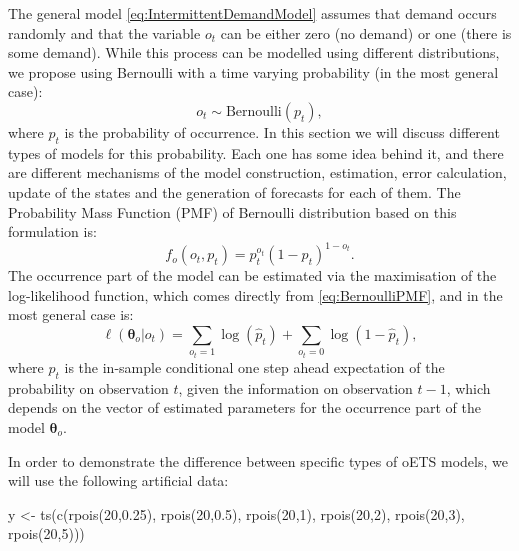 \documentclass[
]{book}
\newenvironment{Shaded}{\begin{snugshade}}{\end{snugshade}}
\newcommand{\DecValTok}[1]{\textcolor[rgb]{0.00,0.00,0.81}{#1}}
\newcommand{\FloatTok}[1]{\textcolor[rgb]{0.00,0.00,0.81}{#1}}
\newcommand{\FunctionTok}[1]{\textcolor[rgb]{0.00,0.00,0.00}{#1}}
\newcommand{\NormalTok}[1]{#1}
\newcommand{\OtherTok}[1]{\textcolor[rgb]{0.56,0.35,0.01}{#1}}
\theoremstyle{definition}
\theoremstyle{definition}
\theoremstyle{definition}
\theoremstyle{definition}
\theoremstyle{remark}
\begin{document}
The general model \eqref{eq:IntermittentDemandModel} assumes that demand occurs randomly and that the variable \(o_t\) can be either zero (no demand) or one (there is some demand). While this process can be modelled using different distributions, we propose using Bernoulli with a time varying probability (in the most general case):
\begin{equation}
    o_t \sim \text{Bernoulli} \left(p_t \right) ,
  \label{eq:OccurrenceModelBernoulli}
\end{equation}
where \(p_t\) is the probability of occurrence. In this section we will discuss different types of models for this probability. Each one has some idea behind it, and there are different mechanisms of the model construction, estimation, error calculation, update of the states and the generation of forecasts for each of them. The Probability Mass Function (PMF) of Bernoulli distribution based on this formulation is:
\begin{equation}
    f_o(o_t, p_t) = p_t^{o_t}(1-p_t)^{1-o_t}.
  \label{eq:BernoulliPMF}
\end{equation}
The occurrence part of the model can be estimated via the maximisation of the log-likelihood function, which comes directly from \eqref{eq:BernoulliPMF}, and in the most general case is:
\begin{equation}
    \ell \left(\boldsymbol{\theta}_o | o_t \right) = \sum_{o_t=1} \log(\hat{p}_t) + \sum_{o_t=0} \log(1-\hat{p}_t) ,
  \label{eq:oETSLikelihood}
\end{equation}
where \(\hat{p}_t\) is the in-sample conditional one step ahead expectation of the probability on observation \(t\), given the information on observation \(t-1\), which depends on the vector of estimated parameters for the occurrence part of the model \(\boldsymbol{\theta}_o\).

In order to demonstrate the difference between specific types of oETS models, we will use the following artificial data:

\begin{Shaded}
\begin{Highlighting}[]
\NormalTok{y }\OtherTok{\textless{}{-}} \FunctionTok{ts}\NormalTok{(}\FunctionTok{c}\NormalTok{(}\FunctionTok{rpois}\NormalTok{(}\DecValTok{20}\NormalTok{,}\FloatTok{0.25}\NormalTok{), }\FunctionTok{rpois}\NormalTok{(}\DecValTok{20}\NormalTok{,}\FloatTok{0.5}\NormalTok{), }\FunctionTok{rpois}\NormalTok{(}\DecValTok{20}\NormalTok{,}\DecValTok{1}\NormalTok{),}
          \FunctionTok{rpois}\NormalTok{(}\DecValTok{20}\NormalTok{,}\DecValTok{2}\NormalTok{), }\FunctionTok{rpois}\NormalTok{(}\DecValTok{20}\NormalTok{,}\DecValTok{3}\NormalTok{), }\FunctionTok{rpois}\NormalTok{(}\DecValTok{20}\NormalTok{,}\DecValTok{5}\NormalTok{)))}
\end{Highlighting}
\end{Shaded}
\end{document}
